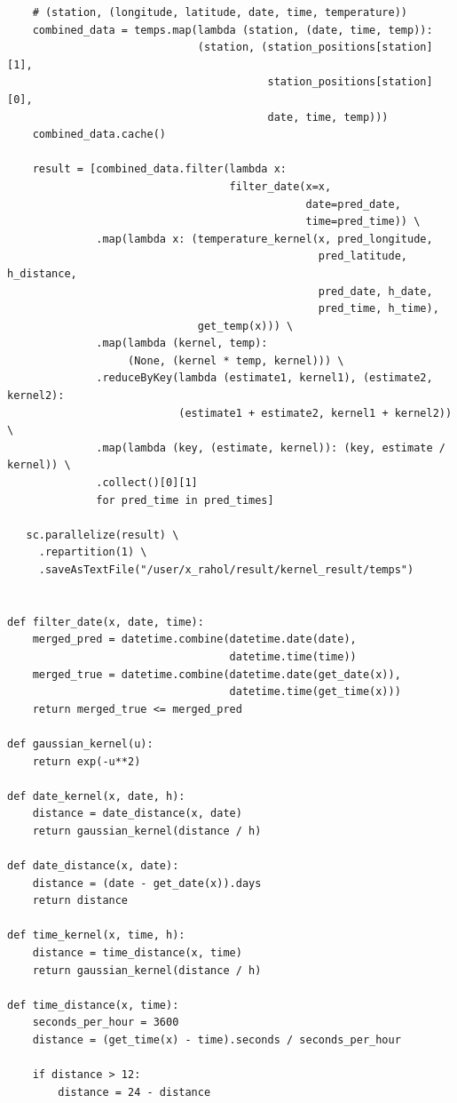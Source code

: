 \documentclass[10pt]{article}
\begin{document}
\begin{verbatim}
    # (station, (longitude, latitude, date, time, temperature))
    combined_data = temps.map(lambda (station, (date, time, temp)):
                              (station, (station_positions[station][1],
                                         station_positions[station][0],
                                         date, time, temp)))
    combined_data.cache()

    result = [combined_data.filter(lambda x:
                                   filter_date(x=x,
                                               date=pred_date,
                                               time=pred_time)) \
              .map(lambda x: (temperature_kernel(x, pred_longitude,
                                                 pred_latitude, h_distance,
                                                 pred_date, h_date,
                                                 pred_time, h_time),
                              get_temp(x))) \
              .map(lambda (kernel, temp):
                   (None, (kernel * temp, kernel))) \
              .reduceByKey(lambda (estimate1, kernel1), (estimate2, kernel2):
                           (estimate1 + estimate2, kernel1 + kernel2)) \
              .map(lambda (key, (estimate, kernel)): (key, estimate / kernel)) \
              .collect()[0][1]
              for pred_time in pred_times]

   sc.parallelize(result) \
     .repartition(1) \
     .saveAsTextFile("/user/x_rahol/result/kernel_result/temps")


def filter_date(x, date, time):
    merged_pred = datetime.combine(datetime.date(date),
                                   datetime.time(time))
    merged_true = datetime.combine(datetime.date(get_date(x)),
                                   datetime.time(get_time(x)))
    return merged_true <= merged_pred

def gaussian_kernel(u):
    return exp(-u**2)

def date_kernel(x, date, h):
    distance = date_distance(x, date)
    return gaussian_kernel(distance / h)

def date_distance(x, date):
    distance = (date - get_date(x)).days
    return distance

def time_kernel(x, time, h):
    distance = time_distance(x, time)
    return gaussian_kernel(distance / h)

def time_distance(x, time):
    seconds_per_hour = 3600
    distance = (get_time(x) - time).seconds / seconds_per_hour

    if distance > 12:
        distance = 24 - distance


\end{verbatim}
\end{document}
